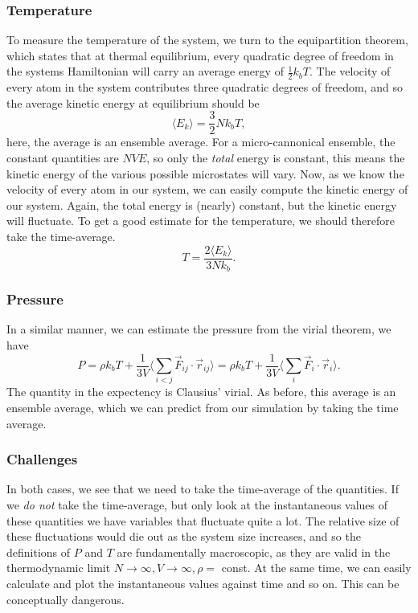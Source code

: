 \documentclass[a4paper, 11pt, notitlepage, english]{article}
\renewcommand{\b}{\bigg}
\begin{document}
\subsubsection*{Temperature}
To measure the temperature of the system, we turn to the equipartition theorem, which states that at thermal equilibrium, every quadratic degree of freedom in the systems Hamiltonian will carry an average energy of $\frac{1}{2}k_b T$. The velocity of every atom in the system contributes three quadratic degrees of freedom, and so the average kinetic energy at equilibrium should be
$$\langle E_k \rangle = \frac{3}{2}N k_b T,$$
here, the average is an ensemble average. For a micro-cannonical ensemble, the constant quantities are $NVE$, so only the \emph{total} energy is constant, this means the kinetic energy of the various possible microstates will vary. Now, as we know the velocity of every atom in our system, we can easily compute the kinetic energy of our system. Again, the total energy is (nearly) constant, but the kinetic energy will fluctuate. To get a good estimate for the temperature, we should therefore take the time-average.
$$T = \frac{2\langle E_k \rangle}{3Nk_b}.$$

\subsubsection*{Pressure}

In a similar manner, we can estimate the pressure from the virial theorem, we have
$$P = \rho k_b T + \frac{1}{3V}\bigg\langle \sum_{i<j}\vec{F}_{ij} \cdot \vec{r}_{ij} \b\rangle= \rho k_b T + \frac{1}{3V}\b\langle\sum_{i}\vec{F}_{i} \cdot \vec{r}_{i}\b\rangle.$$
The quantity in the expectency is Clausius' virial. As before, this average is an ensemble average, which we can predict from our simulation by taking the time average.

\subsubsection*{Challenges}

In both cases, we see that we need to take the time-average of the quantities. If we \emph{do not} take the time-average, but only look at the instantaneous values of these quantities we have variables that fluctuate quite a lot. The relative size of these fluctuations would die out as the system size increases, and so the definitions of $P$ and $T$ are fundamentally macroscopic, as they are valid in the thermodynamic limit $N\to\infty, V\to \infty, \rho=$ const. At the same time, we can easily calculate and plot the instantaneous values against time and so on. This can be conceptually dangerous.
\end{document}
